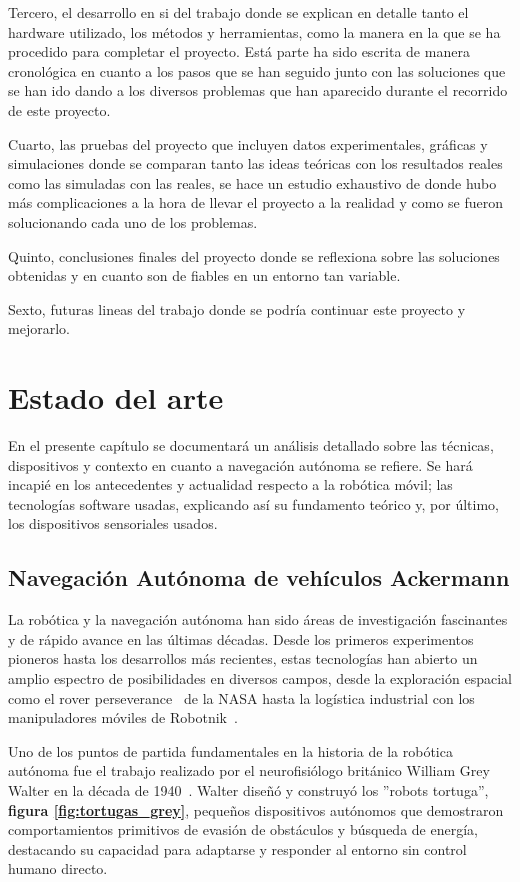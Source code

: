Tercero, el desarrollo en si del trabajo donde se explican en detalle tanto el hardware utilizado, los métodos y herramientas, como la manera en la que 
se ha procedido para completar el proyecto. Está parte ha sido escrita de manera cronológica en cuanto a los pasos que se han seguido junto 
con las soluciones que se han ido dando a los diversos problemas que han aparecido durante el recorrido de este proyecto.

Cuarto, las pruebas del proyecto que incluyen datos experimentales, gráficas y simulaciones donde se comparan tanto las ideas teóricas con 
los resultados reales como las simuladas con las reales, se hace un estudio exhaustivo de donde hubo más complicaciones a la hora de llevar 
el proyecto a la realidad y como se fueron solucionando cada uno de los problemas.

Quinto, conclusiones finales del proyecto donde se reflexiona sobre las soluciones obtenidas y en cuanto son de fiables en un entorno tan 
variable.

Sexto, futuras lineas del trabajo donde se podría continuar este proyecto y mejorarlo.

\chapter{Estado del arte}

En el presente capítulo se documentará un análisis detallado sobre las técnicas, dispositivos y contexto en cuanto 
a navegación autónoma se refiere. Se hará incapié en los antecedentes y actualidad respecto a la robótica móvil; 
las tecnologías software usadas, explicando así su fundamento teórico y, por último, los dispositivos 
sensoriales usados.

\section{Navegación Autónoma de vehículos Ackermann}
La robótica y la navegación autónoma han sido áreas de investigación fascinantes y de rápido avance en las últimas décadas. 
Desde los primeros experimentos pioneros hasta los desarrollos más recientes, estas tecnologías han abierto un amplio espectro de 
posibilidades en diversos campos, desde la exploración espacial como el rover perseverance~\Cite{nasa24} de la NASA hasta la logística 
industrial con los manipuladores móviles de Robotnik~\Cite{robotnik24}.

Uno de los puntos de partida fundamentales en la historia de la robótica autónoma fue el trabajo realizado por el neurofisiólogo británico 
William Grey Walter en la década de 1940~\cite{holland2003first}. Walter diseñó y construyó los ''robots tortuga'', \textbf{figura \ref{fig:tortugas_grey}}, pequeños dispositivos 
autónomos que demostraron comportamientos primitivos de evasión de obstáculos y búsqueda de energía, destacando su capacidad 
para adaptarse y responder al entorno sin control humano directo.

